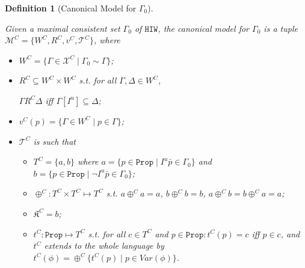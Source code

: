 \documentclass{article}
\newtheorem{defi}{Definition}
\begin{document}
\begin{defi}[Canonical Model for $\Gamma_{0}$]
\label{canmodIU}

Given a maximal consistent set $\Gamma_{0}$ of $\texttt{HIW}$, the canonical model for $\Gamma_{0}$ is a tuple $\mathcal{M}^{C} = \{W^{C}, R^{C}, v^{C}, \mathcal{T}^{C}\}$, where 

\begin{itemize}

\item $W^{C} = \{ \Gamma \in \mathcal{X}^{C} \mid \Gamma_{0} \sim \Gamma\}$;

\item $R^{C} \subseteq W^{C} \times W^{C}$ s.t. for all $\Gamma, \Delta \in W^{C}$, 

\begin{center}

$\Gamma R^{C} \Delta$ iff $\Gamma[I^{u}] \subseteq \Delta$;

\end{center}

\item $v^{C}(p) = \{\Gamma \in W^{C} \mid p \in \Gamma\}$;

\item $\mathcal{T}^{C}$ is such that

\begin{itemize}

\item $T^{C}= \{a, b\}$ where $a = \{p \in \mathtt{Prop} \mid I^{u} \bar{p} \in \Gamma_{0}\}$ and $b = \{ p \in \mathtt{Prop} \mid \neg I^{u} \bar{p} \in \Gamma_{0}\}$;

\item $\oplus^{C} : T^{C} \times T^{C} \mapsto T^{C}$ s.t. $a \oplus^{C} a = a$, $b \oplus^{C} b = b$, $a \oplus^{C} b = b \oplus^{C} a = a$;

\item $\mathfrak{K}^{C} = b$;

\item $t^{C}: \mathtt{Prop} \mapsto T^{C}$ s.t. for all $c \in T^{C}$ and $p \in \mathtt{Prop} : t^{C}(p) = c$ iff $p \in c$, and $t^{C}$ extends to the whole language by $t^{C}(\phi) = \oplus^{C}\{t^{C}(p) \mid p \in Var(\phi)\}$.

\end{itemize}

\end{itemize}

\end{defi}
\end{document}
